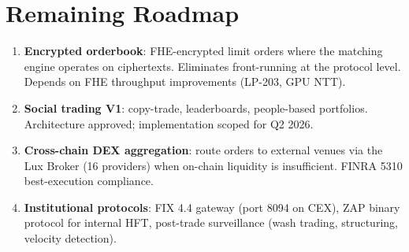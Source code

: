 \section{Remaining Roadmap}
\label{sec:roadmap}


\begin{enumerate}[nosep]
  \item \textbf{Encrypted orderbook}: FHE-encrypted limit orders
        where the matching engine operates on ciphertexts. Eliminates
        front-running at the protocol level. Depends on FHE throughput
        improvements (LP-203, GPU NTT).
  \item \textbf{Social trading V1}: copy-trade, leaderboards,
        people-based portfolios. Architecture approved; implementation
        scoped for Q2 2026.
  \item \textbf{Cross-chain DEX aggregation}: route orders to external
        venues via the Lux Broker (16 providers) when on-chain
        liquidity is insufficient. FINRA 5310 best-execution
        compliance.
  \item \textbf{Institutional protocols}: FIX 4.4 gateway (port 8094
        on CEX), ZAP binary protocol for internal HFT, post-trade
        surveillance (wash trading, structuring, velocity detection).
\end{enumerate}

